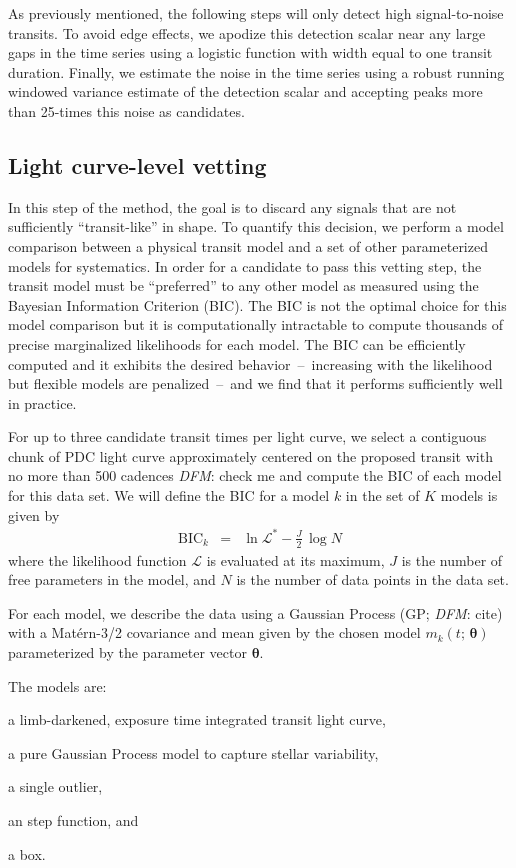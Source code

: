 \documentclass[manuscript, letterpaper]{aastex6}
\newcommand{\bvec}[1]{{\ensuremath{\boldsymbol{#1}}}}
\newcommand{\todo}[3]{{\color{#2}\emph{#1}: #3}}
\newcommand{\dfmtodo}[1]{\todo{DFM}{red}{#1}}
\newcommand{\meanpars}{{\ensuremath{\bvec{\theta}}}}
\begin{document}
As previously mentioned, the following steps will only detect high
signal-to-noise transits.
To avoid edge effects, we apodize this detection scalar near any large gaps in
the time series using a logistic function with width equal to one transit
duration.
Finally, we estimate the noise in the time series using a robust running
windowed variance estimate of the detection scalar and accepting peaks more
than 25-times this noise as candidates.

\subsection{Light curve-level vetting}

In this step of the method, the goal is to discard any signals that are not
sufficiently ``transit-like'' in shape.
To quantify this decision, we perform a model comparison between a physical
transit model and a set of other parameterized models for systematics.
In order for a candidate to pass this vetting step, the transit model must be
``preferred'' to any other model as measured using the Bayesian Information
Criterion (BIC).
The BIC is not the optimal choice for this model comparison but it is
computationally intractable to compute thousands of precise marginalized
likelihoods for each model.
The BIC can be efficiently computed and it exhibits the desired
behavior~--~increasing with the likelihood but flexible models are
penalized~--~and we find that it performs sufficiently well in practice.

For up to three candidate transit times per light curve, we select a
contiguous chunk of PDC light curve approximately centered on the proposed
transit with no more than 500 cadences \dfmtodo{check me} and compute the BIC
of each model for this data set.
We will define the BIC for a model $k$ in the set of $K$ models is given by
\begin{eqnarray}
\mathrm{BIC}_k &=& \ln \mathcal{L}^* - \frac{J}{2}\,\log N
\end{eqnarray}
where the likelihood function $\mathcal{L}$ is evaluated at its maximum, $J$
is the number of free parameters in the model, and $N$ is the number of
data points in the data set.

For each model, we describe the data using a Gaussian Process (GP;
\dfmtodo{cite}) with a Mat\'ern-3/2 covariance and mean given by the chosen
model $m_k(t;\,\meanpars)$ parameterized by the parameter vector \meanpars.

The models are:
\begin{itemize}
{\item a limb-darkened, exposure time integrated transit light curve,}
{\item a pure Gaussian Process model to capture stellar variability,}
{\item a single outlier,}
{\item an step function, and}
{\item a box.}
\end{itemize}
\end{document}
